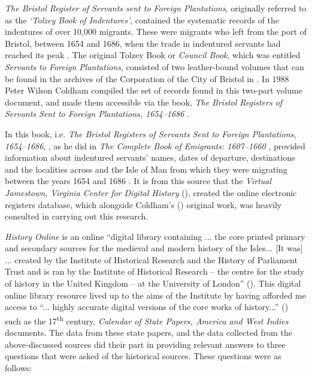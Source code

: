 \emph{The Bristol Register of Servants sent to Foreign Plantations}, originally referred to as the \emph{`Tolzey Book of Indentures'}, contained the systematic records of the indentures of over 10,000  migrants. These were migrants who left from the port of Bristol, between 1654 and 1686, when the trade in indentured servants had reached its peak \citep{Smith47, Morgan93}. The original Tolzey Book or \emph{Council Book}, which was entitled \emph{Servants to Foreign Plantations}, consisted of two leather-bound volumes that can be found in the archives of the Corporation of the City of Bristol in . In 1988 Peter Wilson Coldham compiled the set of records found in this two-part volume document, and made them accessible via the book, \emph{The Bristol Registers of Servants Sent to Foreign Plantations, 1654--1686} \citep{Coldham88}.

In this book, i.e. \emph{The Bristol Registers of Servants Sent to Foreign Plantations, 1654--1686}, \citet{Coldham88}, as he did in \emph{The Complete Book of Emigrants: 1607--1660} \citep{Coldham92, Coldham87}, provided information about indentured servants' names, dates of departure, destinations and the localities across  and the Isle of Man from which they were migrating between the years 1654 and 1686 \citep{Sacks93}. It is from this source that the  \emph{Virtual Jamestown, Virginia Center for Digital History} (\citeauthor{vcdh}), created the online electronic registers database, which alongside Coldham's (\citeyear{Coldham92, Coldham87}) original work, was heavily consulted in carrying out this research.

\emph{ History Online} is an online ``digital library containing ... the core printed primary and secondary sources for the medieval and modern history of the  Isles... [It was] ... created by the Institute of Historical Research and the History of Parliament Trust and is ran by the Institute of Historical Research -- the centre for the study of history in the United Kingdom -- at the University of London''  (\citeauthor{bho09}). This digital online library resource lived up to the aims of the Institute by having afforded me access to ``... highly accurate digital versions of the core works of  history...'' (\citeauthor{bho09}) such as the 17\textsuperscript{th} century, \emph{Calendar of State Papers,  America and West Indies} documents. The data from these state papers, and the data collected from the above-discussed sources did their part in providing relevant answers to three questions that were asked of the historical sources. These questions were as follows:

